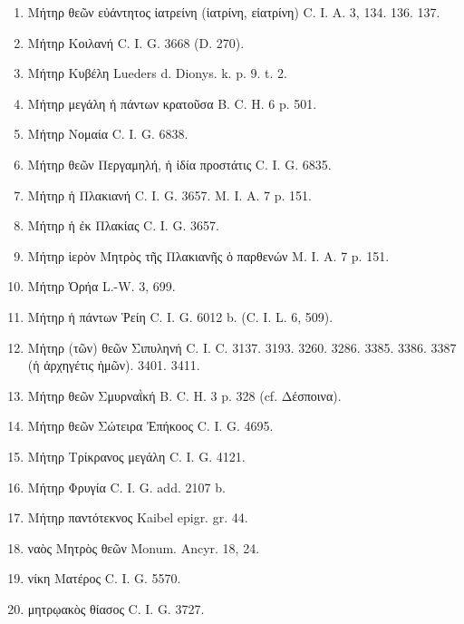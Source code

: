 \documentclass[a4paper, 11pt, oneside, polutonikogreek, german]{article}
\begin{document}
\begin{enumerate}
\item Μήτηρ θεῶν εὐάντητος ἰατρείνη (ἰατρίνη, εἱατρίνη) C. I. A. 3, 134. 136. 137.

\item Μήτηρ Κοιλανή C. I. G. 3668 (D. 270).

\item Μήτηρ Κυβέλη Lueders d. Dionys. k. p. 9. t. 2.

\item Μήτηρ μεγάλη ἡ πάντων κρατοῦσα B. C. H. 6 p. 501.

\item Μήτηρ Νομαία C. I. G. 6838.

\item Μήτηρ θεῶν Περγαμηλή, ἡ ἰδία προστάτις C. I. G. 6835.

\item Μήτηρ ἡ Πλακιανή C. I. G. 3657. M. I. A. 7 p. 151.

\item Μήτηρ ἡ ἐκ Πλακίας C. I. G. 3657.

\item Μήτηρ ἱερὸν Μητρὸς τῆς Πλακιανῆς ὁ παρθενών M. I. A. 7 p. 151.

\item Μήτηρ Ὀρήα L.-W. 3, 699.

\item Μήτηρ ἡ πάντων Ῥείη C. I. G. 6012 b. (C. I. L. 6, 509).

\item Μήτηρ (τῶν) θεῶν Σιπυληνή C. I. C. 3137. 3193. 3260. 3286. 3385. 3386. 3387 (ἡ ἀρχηγέτις ἡμῶν). 3401. 3411.

\item Μήτηρ θεῶν Σμυρναῒκή B. C. H. 3 p. 328 (cf. Δέσποινα).

\item Μήτηρ θεῶν Σώτειρα Ἐπήκοος C. I. G. 4695.

\item Μήτηρ Τρίκρανος μεγάλη C. I. G. 4121.

\item Μήτηρ Φρυγία C. I. G. add. 2107 b.

\item Μήτηρ παντότεκνος Kaibel epigr. gr. 44.

\item ναὸς Μητρὸς θεῶν Monum. Ancyr. 18, 24.

\item νίκη Ματέρος C. I. G. 5570.

\item μητρῳακὸς θίασος C. I. G. 3727.


\end{enumerate}
\end{document}
